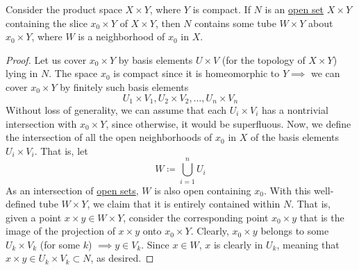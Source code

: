   \begin{lemma}
    \label{thm:tube-lemma}
    Consider the product space $X \times Y$, where $Y$ is compact. If $N$ is an \hyperref[def:open-set]{open set} $X \times Y$ containing the slice $x_0 \times Y$ of $X \times Y$, then $N$ contains some tube $W \times Y$ about $x_0 \times Y$, where $W$ is a neighborhood of $x_0$ in $X$. 

    \begin{figure}[H]
      \centering 
      \label{fig:tube_lemma}
    \end{figure}
  \end{lemma}
  \begin{proof}
    Let us cover $x_0 \times Y$ by basis elements $U \times V$ (for the topology of $X \times Y$) lying in $N$. The space $x_0$ is compact since it is homeomorphic to $Y \implies$ we can cover $x_0 \times Y$ by finitely such basis elements
    \begin{equation}
      U_1 \times V_1, U_2 \times V_2, \ldots , U_n \times V_n
    \end{equation}
    Without loss of generality, we can assume that each $U_i \times V_i$ has a nontrivial intersection with $x_0 \times Y$, since otherwise, it would be superfluous. Now, we define the intersection of all the open neighborhoods of $x_0$ in $X$ of the basis elements $U_i \times V_i$. That is, let
    \begin{equation}
      W \coloneqq \bigcup_{i=1}^n U_i
    \end{equation}
    As an intersection of \hyperref[def:open-set]{open sets}, $W$ is also open containing $x_0$. With this well-defined tube $W \times Y$, we claim that it is entirely contained within $N$. That is, given a point $x \times y \in W \times Y$, consider the corresponding point $x_0 \times y$ that is the image of the projection of $x\times y$ onto $x_0 \times Y$. Clearly, $x_0 \times y$ belongs to some $U_k \times V_k$ (for some $k$) $\implies y \in V_k$. Since $x \in W$, $x$ is clearly in $U_k$, meaning that $x \times y \in U_k \times V_k \subset N$, as desired. 
  \end{proof}

